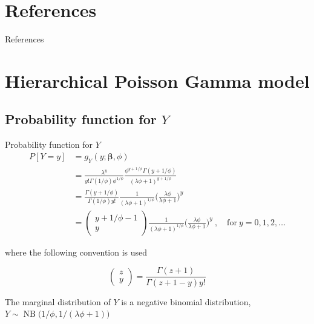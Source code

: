 \documentclass[aspectratio=169]{beamer}
\DeclareMathOperator{\NB}{NB}
\begin{document}
\hypertarget{references}{%
\section{References}\label{references}}

\begin{frame}{References}
\printbibliography[heading=none]
\end{frame}

\hypertarget{hierarchical-poisson-gamma-model}{%
\section{Hierarchical Poisson Gamma
model}\label{hierarchical-poisson-gamma-model}}

\hypertarget{probability-function-for-y}{%
\subsection{\texorpdfstring{Probability function for
\(Y\)}{Probability function for Y}}\label{probability-function-for-y}}

\begin{frame}{Probability function for \(Y\)}
\begin{equation} \label{eq:pdfMix}
  \begin{aligned}
    P[Y=y]&=g_{Y}(y;\boldsymbol \beta, \phi) \\
    &=\frac{\lambda^{y}}{y!\Gamma(1/\phi)\phi^{1/\phi}}\frac{\phi^{y+1/\phi}\Gamma(y+1/\phi)}{(\lambda \phi + 1)^{y+1/\phi}} \\
    &=\frac{\Gamma(y+1/\phi)}{\Gamma(1/\phi)y!}\frac{1}{(\lambda\phi+1)^{1/\phi}}\bigg(\frac{\lambda\phi}{\lambda\phi+1}\bigg)^{y} \\
    &=\begin{pmatrix} y+1/\phi-1 \\ y \end{pmatrix} \frac{1}{(\lambda\phi+1)^{1/\phi}}\bigg(\frac{\lambda\phi}{\lambda\phi+1}\bigg)^{y} \ , \quad \mathrm{for} \ y = 0, 1, 2, \dots
  \end{aligned}
\end{equation}

where the following convention is used

\begin{equation}
  \begin{pmatrix} z\\y \end{pmatrix} = \frac{\Gamma(z+1)}{\Gamma(z+1-y)y!}
\end{equation}

The marginal distribution of \(Y\) is a negative binomial distribution,
\(Y\sim \NB\big(1/\phi,1/(\lambda \phi+1)\big)\)
\end{frame}
\end{document}
